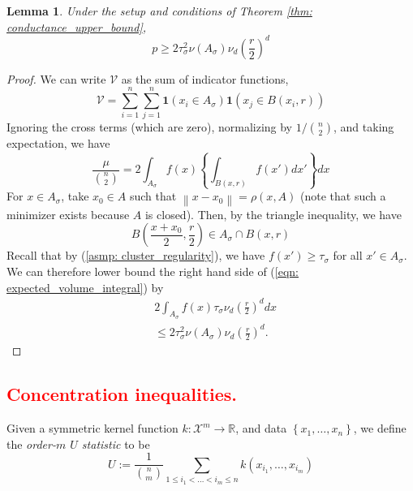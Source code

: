 \documentclass{article}
\newcommand{\set}[1]{\left\{#1\right\}}
\newcommand{\Reals}{\mathbb{R}}
\newcommand{\norm}[1]{\left\lVert#1\right\rVert}
\newcommand{\Asig}{A_{\sigma}}
\newcommand{\1}{\mathbf{1}}
\theoremstyle{aldenthm}
\newtheorem{lemma}{Lemma}
\begin{document}
\begin{lemma}
	\label{lem: expected_density_volume}
	Under the setup and conditions of Theorem \ref{thm: conductance_upper_bound},
	\begin{equation*}
	p \geq 2 \tau_{\sigma}^2 \nu(\Asig) \nu_d \left(\frac{r}{2}\right)^d
	\end{equation*}
\end{lemma}
\begin{proof}
	We can write $\mathcal{V}$ as the sum of indicator functions,
	\begin{equation}
	\label{eqn: volume_expansion}
	\mathcal{V} = \sum_{i = 1}^{n} \sum_{j = 1}^{n} \1(x_i \in \Asig) \1(x_j \in B(x_i, r))
	\end{equation}
		Ignoring the cross terms (which are zero), normalizing by $1/{n \choose 2}$, and taking expectation, we have
	\begin{equation}
	\label{eqn: expected_volume_integral}
	\frac{\mu}{{n \choose 2}} = 2 \int_{\Asig} f(x) \left\{\int_{B(x,r)} f(x') dx' \right\} dx
	\end{equation}
	For $x \in \Asig$, take $x_0 \in A$ such that $\norm{x - x_0} = \rho(x,A)$ (note that such a minimizer exists because $A$ is closed). Then, by the triangle inequality, we have
	\begin{equation*}
	B\left(\frac{x + x_0}{2}, \frac{r}{2}\right) \in \Asig \cap B(x,r)
	\end{equation*}
	Recall that by (\ref{asmp: cluster_regularity}), we have $f(x') \geq \tau_{\sigma}$ for all $x' \in \Asig$. We can therefore lower bound the right hand side of (\ref{eqn: expected_volume_integral}) by
	\begin{align*}
	& 2\int_{\Asig} f(x) \tau_{\sigma} \nu_d \left(\frac{r}{2}\right)^{d} dx \\
	& \leq 2\tau_{\sigma}^2 \nu(\Asig) \nu_d \left(\frac{r}{2}\right)^d.
	\end{align*}
\end{proof}

\subsection{\textcolor{red}{Concentration inequalities.}}

Given a symmetric kernel function $k: \mathcal{X}^m \to \Reals$, and data $\set{x_1, \ldots, x_n}$, we define the \textit{order-$m$ $U$ statistic} to be 
\begin{equation*}
U := \frac{1}{ {n \choose m} } \sum_{1 \leq i_1 < \ldots < i_m \leq n} k(x_{i_1},\ldots,x_{i_m})
\end{equation*}
\end{document}
